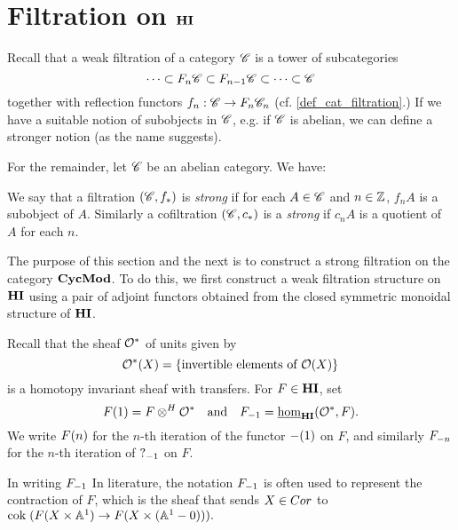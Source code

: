 \section{Filtration on $\HI$}\label{sect_filtration_hi}

Recall that a weak filtration of a category $\Cat{C}$ is a tower 
of subcategories
\[
\cdots \subset F_n\Cat{C} \subset F_{n - 1}\Cat{C} \subset \cdots 
   \subset \Cat{C}
\]
together with reflection functors $f_n : \Cat{C} \to F_n\Cat{C}_n$
(cf. \ref{def_cat_filtration}.) If we have a suitable notion of
subobjects in $\Cat{C}$, e.g. if $\Cat{C}$ is abelian, we can 
define a stronger notion (as the name suggests).

For the remainder, let $\Cat{C}$ be an abelian category. We have:

\begin{defn}
We say that a filtration $(\Cat{C}, f_*)$ is \emph{strong} if for
each $A \in \Cat{C}$ and $n \in \Z$, $f_n A$ is a subobject of 
$A$. Similarly a cofiltration $(\Cat{C}, c_*)$ is a \emph{strong} 
if $c_n A$ is a quotient of $A$ for each $n$.
\end{defn}

The purpose of this section and the next is to construct a 
strong filtration on the category $\CycMod$. To do this, we first
construct a weak filtration structure on $\HI$ using a pair
of adjoint functors obtained from the closed symmetric monoidal 
structure of $\HI$. 

Recall that the sheaf $\Ox$ of units given by 
\[
\Ox(X) = \{\textrm{invertible elements of }\O(X)\}
\]
is a homotopy invariant sheaf with transfers. For $F \in \HI$, 
set
\[
\LHI{F} = F \tHI \Ox \hspace{10pt} \textrm{and}\hspace{10pt} 
   \RHI{F} = \ihomHI(\Ox, F).  
\]
We write $\LHI[n]{F}$ for the $n$-th iteration of the functor
$\LHI{-}$ on $F$, and similarly $\RHI[n]{F}$ for the $n$-th 
iteration of $\RHI{?}$ on $F$.

\begin{rmk}
In writing $\RHI{F}$ 
In literature, the notation $\RHI{F}$ is often used to represent
the contraction of $F$, which is the sheaf that sends $X \in 
\Cor$ to $\cok( F(X \times \A^1) \to F(X \times (\A^1 - 0))).$
\end{rmk}
